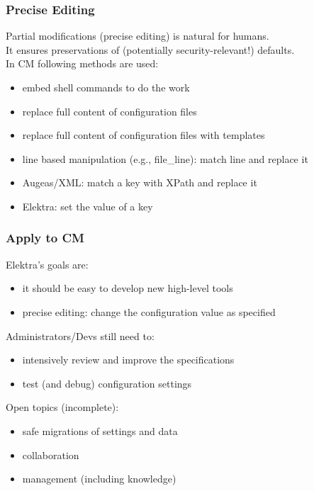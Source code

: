 \begin{frame}
	\frametitle{Precise Editing}

	Partial modifications (precise editing) is natural for humans. \\
	It ensures preservations of (potentially security-relevant!) defaults. \\
	In CM following methods are used:

	\begin{itemize}[<+-| alert@+>]
	\item embed shell commands to do the work
	\item replace full content of configuration files
	\item replace full content of configuration files with templates
	\item line based manipulation (e.g., file\_line): match line and replace it
	\item Augeas/XML: match a key with XPath and replace it
	\item Elektra: set the value of a key
	\end{itemize}
\end{frame}

\begin{frame}
	\frametitle{Apply to CM}

	Elektra's goals are:

	\begin{itemize}[<+-| alert@+>]
	\item it should be easy to develop new high-level tools
	\item precise editing: change the configuration value as specified
	\end{itemize}

	\pause[\thebeamerpauses]  %

	Administrators/Devs still need to:

	\begin{itemize}[<+-| alert@+>]
	\item intensively review and improve the specifications
	\item test (and debug) configuration settings
	\end{itemize}

	\pause[\thebeamerpauses]  %

	Open topics (incomplete):

	\begin{itemize}[<+-| alert@+>]
	\item safe migrations of settings and data
	\item collaboration
	\item management (including knowledge)
	\end{itemize}
\end{frame}

